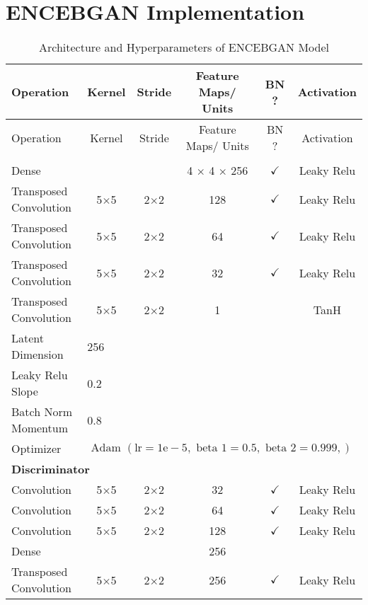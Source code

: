 \section{ENCEBGAN Implementation}
\label{app:encebgan}
\begin{longtable}[c]{@{}lccccc@{}}
	\caption{Architecture and Hyperparameters of ENCEBGAN Model}
	\label{tab:encebgan_imp}\\
	\toprule
	Operation & Kernel & Stride & Feature Maps/ Units & BN ? & Activation \\* \midrule
	\endfirsthead
	\toprule
	Operation & Kernel & Stride & Feature Maps/ Units & BN ? & Activation \\* \midrule
	\endhead
	\bottomrule
	\endfoot
	\endlastfoot
	\multicolumn{6}{l}{\textbf{Generator}} \\
	Dense & \multicolumn{1}{c}{} &  & 4 $\times$ 4 $\times$ 256 & $\checkmark$ & Leaky Relu \\
	Transposed Convolution & \multicolumn{1}{c}{5$\times$5} & 2$\times$2 & 128 & $\checkmark$ & Leaky Relu \\
	Transposed Convolution & \multicolumn{1}{c}{5$\times$5} & 2$\times$2 & 64 & $\checkmark$ & Leaky Relu \\
	Transposed Convolution & \multicolumn{1}{c}{5$\times$5} & 2$\times$2 & 32 & $\checkmark$ & Leaky Relu \\
	Transposed Convolution & \multicolumn{1}{c}{5$\times$5} & 2$\times$2 & 1 &  & TanH\\
	Latent Dimension & \multicolumn{5}{l}{256} \\
	Leaky Relu Slope & \multicolumn{5}{l}{0.2} \\
	Batch Norm Momentum & \multicolumn{5}{l}{0.8} \\
	Optimizer & \multicolumn{5}{l}{$\text { Adam }(\mathrm{lr}=1 \mathrm{e}-5, \text { beta } 1=0.5, \text { beta } 2=0.999,)$} \\ \hline
	\multicolumn{6}{l}{\textbf{Discriminator}} \\
	Convolution & \multicolumn{1}{c}{5$\times$5} & 2$\times$2 & 32 & $\checkmark$ & Leaky Relu \\
	Convolution & \multicolumn{1}{c}{5$\times$5} & 2$\times$2 & 64 & $\checkmark$ & Leaky Relu \\
	Convolution & \multicolumn{1}{c}{5$\times$5} & 2$\times$2 & 128 & $\checkmark$ & Leaky Relu \\
	Dense & \multicolumn{1}{c}{} &  & 256 &  &  \\ \hline
	Transposed Convolution & \multicolumn{1}{c}{5$\times$5} & 2$\times$2 & 256 & $\checkmark$ & Leaky Relu \\

\end{longtable}
